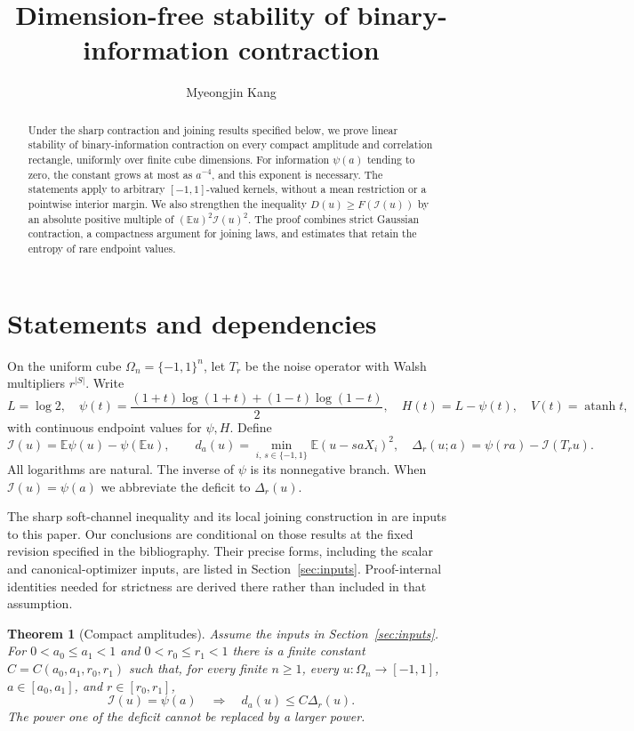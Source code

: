 \documentclass[11pt,reqno]{amsart}
\title[Stability of binary-information contraction]{Dimension-free stability of binary-information contraction}
\author{Myeongjin Kang}
\date{}
\numberwithin{equation}{section}
\newtheorem{theorem}{Theorem}[section]
\theoremstyle{definition}
\theoremstyle{remark}
\newcommand{\E}{\mathbb E}
\newcommand{\cI}{\mathcal I}
\DeclareMathOperator{\atanh}{atanh}
\begin{document}
\begin{abstract}
Under the sharp contraction and joining results specified below, we prove
linear stability of binary-information contraction on every compact
amplitude and correlation rectangle, uniformly over finite cube dimensions.
For information $\psi(a)$ tending to zero, the constant grows at most as
$a^{-4}$, and this exponent is necessary. The statements apply to arbitrary
$[-1,1]$-valued kernels, without a mean restriction or a pointwise interior
margin. We also strengthen the inequality $D(u)\ge F(\cI(u))$ by an
absolute positive multiple of $(\E u)^2\cI(u)^2$. The proof combines strict Gaussian
contraction, a compactness argument for joining laws, and estimates that
retain the entropy of rare endpoint values.
\end{abstract}
\maketitle

\section{Statements and dependencies}
On the uniform cube $\Omega_n=\{-1,1\}^n$, let $T_r$ be the noise
operator with Walsh multipliers $r^{|S|}$. Write
\[
 L=\log2,\quad \psi(t)=\frac{(1+t)\log(1+t)+(1-t)\log(1-t)}2,
 \quad H(t)=L-\psi(t),\quad V(t)=\atanh t,
\]
with continuous endpoint values for $\psi,H$. Define
\[
 \cI(u)=\E\psi(u)-\psi(\E u),\qquad
 d_a(u)=\min_{i,\,s\in\{-1,1\}}\E(u-saX_i)^2,
 \quad \Delta_r(u;a)=\psi(ra)-\cI(T_ru).
\]
All logarithms are natural. The inverse of $\psi$ is its nonnegative
branch. When $\cI(u)=\psi(a)$ we abbreviate the deficit to $\Delta_r(u)$.

The sharp soft-channel inequality and its local joining construction in
\cite{OpenAI} are inputs to this paper. Our conclusions are conditional on
those results at the fixed revision specified in the bibliography. Their
precise forms, including the scalar and canonical-optimizer inputs, are
listed in Section~\ref{sec:inputs}. Proof-internal identities needed for
strictness are derived there rather than included in that assumption.

\begin{theorem}[Compact amplitudes]\label{thm:compact}
Assume the inputs in Section~\ref{sec:inputs}. For
$0<a_0\le a_1<1$ and $0<r_0\le r_1<1$ there is a finite constant
$C=C(a_0,a_1,r_0,r_1)$ such that, for every finite $n\ge1$, every
$u:\Omega_n\to[-1,1]$, $a\in[a_0,a_1]$, and $r\in[r_0,r_1]$,
\[
 \cI(u)=\psi(a)\quad\Longrightarrow\quad d_a(u)\le C\Delta_r(u).
\]
The power one of the deficit cannot be replaced by a larger power.
\end{theorem}
\end{document}

